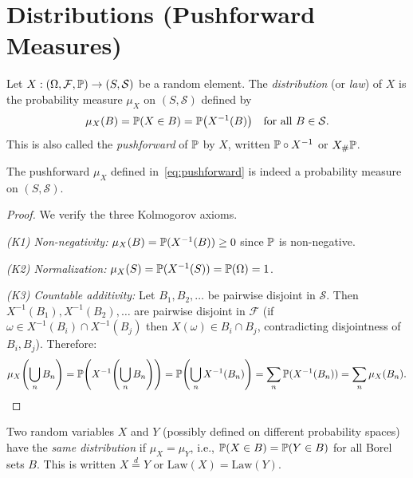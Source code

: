 \documentclass[11pt,a4paper]{article}
\begin{document}

\section{Distributions (Pushforward Measures)}
\label{sec:distribution}

\begin{definition}
\label{def:pushforward}
Let $X: (\Omega, \mathcal{F}, \mathbb{P}) \to (S, \mathcal{S})$ be a random
element. The \emph{distribution} (or \emph{law}) of $X$ is the probability
measure $\mu_X$ on $(S, \mathcal{S})$ defined by
\begin{equation}
  \mu_X(B) = \mathbb{P}(X \in B) = \mathbb{P}\bigl(X^{-1}(B)\bigr)
  \quad \text{for all } B \in \mathcal{S}.
  \label{eq:pushforward}
\end{equation}
This is also called the \emph{pushforward} of $\mathbb{P}$ by $X$, written
$\mathbb{P} \circ X^{-1}$ or $X_\# \mathbb{P}$.
\end{definition}

\begin{proposition}
\label{prop:pushforward_is_prob}
The pushforward $\mu_X$ defined in~\eqref{eq:pushforward} is indeed a
probability measure on $(S, \mathcal{S})$.
\end{proposition}

\begin{proof}
We verify the three Kolmogorov axioms.

\textit{(K1) Non-negativity:} $\mu_X(B) = \mathbb{P}(X^{-1}(B)) \geq 0$
since $\mathbb{P}$ is non-negative.

\textit{(K2) Normalization:} $\mu_X(S) = \mathbb{P}(X^{-1}(S))
= \mathbb{P}(\Omega) = 1$.

\textit{(K3) Countable additivity:} Let $B_1, B_2, \ldots$ be pairwise
disjoint in $\mathcal{S}$. Then $X^{-1}(B_1), X^{-1}(B_2), \ldots$
are pairwise disjoint in $\mathcal{F}$ (if
$\omega \in X^{-1}(B_i) \cap X^{-1}(B_j)$ then $X(\omega) \in B_i \cap B_j$,
contradicting disjointness of $B_i, B_j$). Therefore:
\[
  \mu_X\!\left(\bigcup_n B_n\right)
  = \mathbb{P}\!\left(X^{-1}\!\left(\bigcup_n B_n\right)\right)
  = \mathbb{P}\!\left(\bigcup_n X^{-1}(B_n)\right)
  = \sum_n \mathbb{P}(X^{-1}(B_n))
  = \sum_n \mu_X(B_n). \qedhere
\]
\end{proof}

\begin{remark}
Two random variables $X$ and $Y$ (possibly defined on different probability
spaces) have the \emph{same distribution} if $\mu_X = \mu_Y$, i.e.,
$\mathbb{P}(X \in B) = \mathbb{P}(Y \in B)$ for all Borel sets $B$. This is written
$X \stackrel{d}{=} Y$ or $\text{Law}(X) = \text{Law}(Y)$.
\end{remark}
\end{document}
